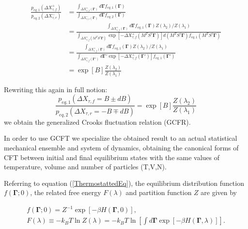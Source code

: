 \documentclass[a4paper,12pt]{article}
\begin{document}
\begin{equation}
\begin{aligned}
\frac{p_{eq,1}(\Delta X_{\tau,f}^+)}{p_{eq,2}(\Delta X_{\tau,r}^-)}
&=\frac{\int_{\Delta X_{\tau,f}^+(\bm{\Gamma})} d\bm{\Gamma} f_{eq,1}(\bm{\Gamma})}{\int_{\Delta X_{\tau,r}^-(\bm{\Gamma})} d\bm{\Gamma} f_{eq,2}(\bm{\Gamma})} \\
&= \frac{\int_{\Delta X_{\tau,f}^+(\bm{\Gamma})} d\bm{\Gamma} f_{eq,1}(\bm{\Gamma})Z(\lambda_2)/Z(\lambda_1)}{\int_{\Delta X_{\tau,f}^+(M^T S^{\tau}\bm{\Gamma})} \exp[-\Delta X_{\tau,f}^+(M^T S^{\tau}\bm{\Gamma})] d(M^T S^{\tau}\bm{\Gamma}) f_{eq,1}(M^T S^{\tau}\bm{\Gamma})} \\
&=\frac{\int_{\Delta X_{\tau,f}^+(\bm{\Gamma})} d\bm{\Gamma} f_{eq,1}(\bm{\Gamma}) Z(\lambda_2)/Z(\lambda_1)}{\int_{\Delta X_{\tau,f}^+(\bm{\Gamma}')} d\bm{\Gamma}' \exp[-\Delta X_{\tau,f}^+(\bm{\Gamma}')] f_{eq,1}(\bm{\Gamma}')} \\
&= \exp[B] \frac{Z(\lambda_2)}{Z(\lambda_1)}
\end{aligned}
\end{equation}


Rewriting this again in full notion:
\begin{equation}
\label{GCFR}
\frac{p_{eq,1}(\Delta X_{\tau,f}=B\pm dB)}{p_{eq,2}(\Delta X_{\tau,r}=-B\mp dB)}= \exp[B] \frac{Z(\lambda_2)}{Z(\lambda_1)}
\end{equation}
we obtain the generalized Crooks fluctuation relation (GCFR).

In order to use GCFT we specialize the obtained result to an actual statistical mechanical ensemble and system of dynamics, obtaining the canonical forms of CFT between initial and final equilibrium states with the same values of temperature, volume and number of particles (T,V,N). 

Referring to equation (\ref{ThermostattedEq}), the equilibrium distribution function $f(\bm{\Gamma};0)$, the related free energy $F(\lambda)$ and partition function $Z$ are given by

\begin{equation}
\begin{aligned}
  f(\bm{\Gamma};0)=Z^{-1} \exp[-\beta H(\bm{\Gamma},0)],\\
  F(\lambda)\equiv - k_B T \ln Z(\lambda) = -k_B T \ln[\int d\bm{\Gamma} \exp[-\beta H(\bm{\Gamma},\lambda)]].
\end{aligned}
\end{equation}
\end{document}
